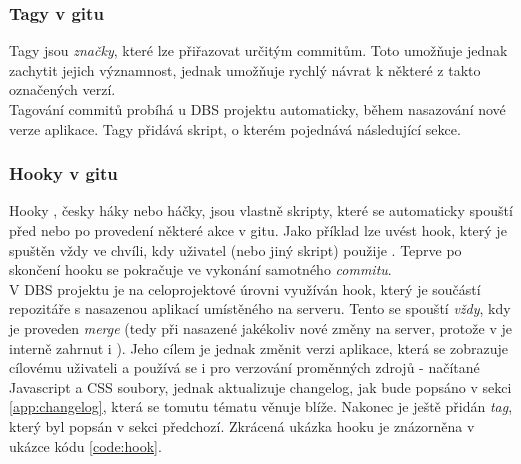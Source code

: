 \subsubsection{Tagy v gitu} \label{version:git:tag}
Tagy \cite{tags} jsou \emph{značky}, které lze přiřazovat určitým commitům. Toto umožňuje jednak zachytit jejich významnost, jednak umožňuje rychlý návrat k některé z takto označených verzí.\\
Tagování commitů probíhá u DBS projektu automaticky, během nasazování nové verze aplikace. Tagy přidává skript, o kterém pojednává následující sekce.

\subsubsection{Hooky v gitu} \label{version:git:hook}
Hooky \cite{hooks}, česky háky nebo háčky, jsou vlastně skripty, které se automaticky spouští před nebo po provedení některé akce v gitu. Jako příklad lze uvést  hook, který je spuštěn vždy ve chvíli, kdy uživatel (nebo jiný skript) použije . Teprve po skončení  hooku se pokračuje ve vykonání samotného \emph{commitu}.\\
V DBS projektu je na celoprojektové úrovni využíván  hook, který je součástí repozitáře s nasazenou aplikací umístěného na serveru. Tento se spouští \emph{vždy}, kdy je proveden \emph{merge} (tedy při nasazené jakékoliv nové změny na server, protože v  je interně zahrnut i ). Jeho cílem je jednak změnit verzi aplikace, která se zobrazuje cílovému uživateli a používá se i pro verzování proměnných zdrojů - načítané Javascript a CSS soubory, jednak aktualizuje changelog, jak bude popsáno v sekci \ref{app:changelog}, která se tomutu tématu věnuje blíže. Nakonec je ještě přidán \emph{tag}, který byl popsán v sekci předchozí. Zkrácená ukázka  hooku je znázorněna v ukázce kódu \ref{code:hook}.
